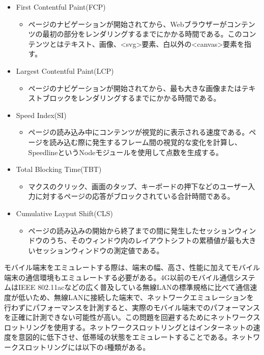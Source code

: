 \begin{itemize}
    \item First Contentful Paint(FCP)
    \begin{itemize}
        \item ページのナビゲーションが開始されてから、Webブラウザーがコンテンツの最初の部分をレンダリングするまでにかかる時間である。このコンテンツとはテキスト、画像、<svg>要素、白以外の<canvas>要素を指す。
    \end{itemize}
    \item Largest Contentful Paint(LCP)
    \begin{itemize}
        \item ページのナビゲーションが開始されてから、最も大きな画像またはテキストブロックをレンダリングするまでにかかる時間である。
    \end{itemize}
    \item Speed Index(SI)
    \begin{itemize}
        \item ページの読み込み中にコンテンツが視覚的に表示される速度である。ページを読み込む際に発生するフレーム間の視覚的な変化を計算し、SpeedlineというNodeモジュールを使用して点数を生成する。
    \end{itemize}
    \item Total Blocking Time(TBT)
    \begin{itemize}
        \item マクスのクリック、画面のタップ、キーボードの押下などのユーザー入力に対するページの応答がブロックされている合計時間である。
    \end{itemize}
    \item Cumulative Layput Shift(CLS)
    \begin{itemize}
        \item ページの読み込みの開始から終了までの間に発生したセッションウィンドウのうち、そのウィンドウ内のレイアウトシフトの累積値が最も大きいセッションウィンドウの測定値である。
    \end{itemize}
\end{itemize}

モバイル端末をエミュレートする際は、端末の幅、高さ、性能に加えてモバイル端末の通信環境もエミュレートする必要がある。4G以前のモバイル通信システムはIEEE 802.11acなどの広く普及している無線LANの標準規格に比べて通信速度が低いため、無線LANに接続した端末で、ネットワークエミュレーションを行わずにパフォーマンスを計測すると、実際のモバイル端末でのパフォーマンスを正確に計測できない可能性が高い。この問題を回避するためにネットワークスロットリングを使用する。ネットワークスロットリングとはインターネットの速度を意図的に低下させ、低帯域の状態をエミュレートすることである。ネットワークスロットリングには以下の4種類がある。

